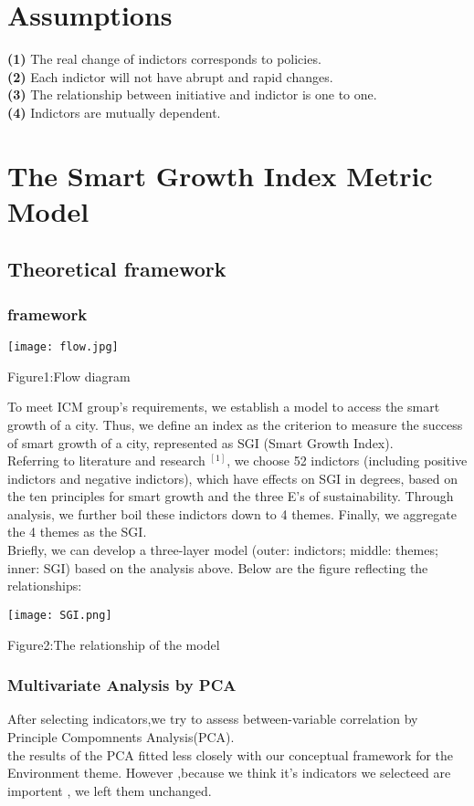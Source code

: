 \documentclass{mcmthesis}
\begin{document}
\section{Assumptions}
{\bf (1) } The real change of indictors corresponds to policies.\\
{\bf (2) } Each indictor will not have abrupt and rapid changes.\\
{\bf (3) } The relationship between initiative and indictor is one to one.\\
{\bf (4) } Indictors are mutually dependent.\\

\section{The Smart Growth Index Metric Model}
\subsection{Theoretical framework}%
\subsubsection{framework}%
\centerline{\texttt{[image: flow.jpg]}}
\centerline{Figure1:Flow diagram}
To meet ICM group's requirements, we establish a model to access the smart growth of a city. Thus, we define an index as the criterion to measure the success of smart growth of a city, represented as SGI (Smart Growth Index).\\
Referring to literature  and research $^{[1]}$, we choose 52 indictors (including positive indictors and negative indictors), which have effects on SGI in degrees, based on the ten principles for smart growth and the three E's of sustainability. Through analysis, we further boil these indictors down to 4 themes. Finally, we aggregate the 4 themes as the SGI.\\
\newpage
\noindent Briefly, we can develop a three-layer model (outer: indictors; middle: themes; inner: SGI) based on the analysis above. Below are the figure reflecting the relationships:\\
\centerline{\texttt{[image: SGI.png]}}
\centerline{Figure2:The relationship of the model }
\subsubsection{Multivariate Analysis by PCA}%
After selecting indicators,we try to assess between-variable correlation by Principle Compomnents Analysis(PCA).\\
the results of the PCA fitted less closely with our conceptual framework for the Environment theme.
However ,because we think it's indicators we selecteed are importent , we left them unchanged.
\end{document}
